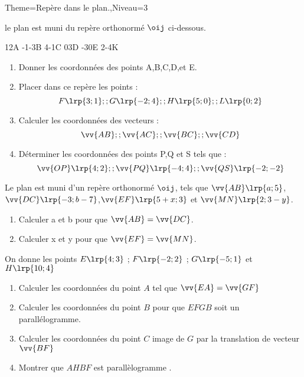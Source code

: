 \documentclass[a4paper,12pt]{article}
\begin{document}
\begin{Maquette}[Fiche]{Theme=Repère dans le plan.,Niveau=3}
\begin{exercice}
le plan est muni du repère orthonormé $\oij$ ci-dessous.\newline
\begin{minipage}{.5\linewidth}
\begin{AffRepere}[-4][4][-4][3]
\coordpoints
{1}{2}{A}
{-1}{-3}{B}
{4}{-1}{C}
{0}{3}{D}
{-3}{0}{E}
{2}{-4}{K}
\end{AffRepere}
\end{minipage}
\begin{minipage}{.5\linewidth}
\begin{enumerate}
\item Donner les coordonnées des points A,B,C,D,et E.
\item Placer dans ce repère les points :
\[
F\lrp{3;1} ;; G\lrp{-2;4} ;; H\lrp{5;0} ;; L\lrp{0;2}
\]
\item Calculer les coordonnées des vecteurs :
\[
\vv{AB} ;; \vv{AC} ;; \vv{BC} ;; \vv{CD}
\]
\item Déterminer les coordonnées des points P,Q et S tels que :
\[
\vv{OP}\lrp{4;2} ;; \vv{PQ}\lrp{-4;4} ;; \vv{QS}\lrp{-2;-2}
\]
\end{enumerate}
\end{minipage}
\end{exercice}

\begin{exercice}
Le plan est muni d'un repère orthonormé $\oij$, tels que $\vv{AB}\lrp{a;5}$,$\vv{DC}\lrp{-3;b-7}$,$\vv{EF}\lrp{5+x;3}$ et $\vv{MN}\lrp{2;3-y}$.
\begin{enumerate}
\item Calculer a et b pour que $\vv{AB}=\vv{DC}$.
\item Calculer x et y pour que $\vv{EF}=\vv{MN}$.
\end{enumerate}
\end{exercice}

\begin{exercice}
On donne les points $E\lrp{4;3}$ ; $F\lrp{-2;2}$ ; $G\lrp{-5;1}$ et $H\lrp{10;4}$ 
\begin{enumerate}
\item Calculer les coordonnées du point $ A $ tel que  $ \vv{EA} = \vv{GF} $ 
\item Calculer les coordonnées du point $ B $ pour que $ EFGB $ soit un parallélogramme. 
\item Calculer les coordonnées du point $ C $ image de $ G $ par la translation de vecteur $ \vv{BF} $  
\item Montrer que $ AHBF $ est parallèlogramme .
\end{enumerate}
\end{exercice}


\end{Maquette}
\end{document}
